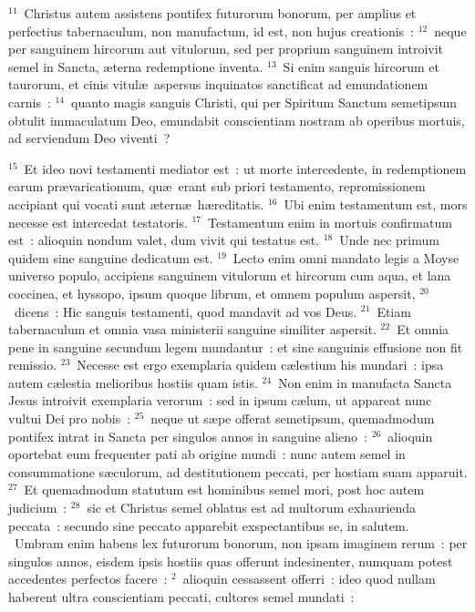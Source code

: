 ${}^{11}$~Christus autem assistens pontifex futurorum bonorum, per amplius et perfectius tabernaculum, non manufactum, id est, non hujus creationis~:
${}^{12}$~neque per sanguinem hircorum aut vitulorum, sed per proprium sanguinem introivit semel in Sancta, \ae terna redemptione inventa.
${}^{13}$~Si enim sanguis hircorum et taurorum, et cinis vitul\ae\ aspersus inquinatos sanctificat ad emundationem carnis~:
${}^{14}$~quanto magis sanguis Christi, qui per Spiritum Sanctum semetipsum obtulit immaculatum Deo, emundabit conscientiam nostram ab operibus mortuis, ad serviendum Deo viventi~?


${}^{15}$~Et ideo novi testamenti mediator est~: ut morte intercedente, in redemptionem earum pr\ae varicationum, qu\ae\ erant sub priori testamento, repromissionem accipiant qui vocati sunt \ae tern\ae\ h\ae reditatis.
${}^{16}$~Ubi enim testamentum est, mors necesse est intercedat testatoris.
${}^{17}$~Testamentum enim in mortuis confirmatum est~: alioquin nondum valet, dum vivit qui testatus est.
${}^{18}$~Unde nec primum quidem sine sanguine dedicatum est.
${}^{19}$~Lecto enim omni mandato legis a Moyse universo populo, accipiens sanguinem vitulorum et hircorum cum aqua, et lana coccinea, et hyssopo, ipsum quoque librum, et omnem populum aspersit,
${}^{20}$~dicens~: Hic sanguis testamenti, quod mandavit ad vos Deus.
${}^{21}$~Etiam tabernaculum et omnia vasa ministerii sanguine similiter aspersit.
${}^{22}$~Et omnia pene in sanguine secundum legem mundantur~: et sine sanguinis effusione non fit remissio.
${}^{23}$~Necesse est ergo exemplaria quidem c\ae lestium his mundari~: ipsa autem c\ae lestia melioribus hostiis quam istis.
${}^{24}$~Non enim in manufacta Sancta Jesus introivit exemplaria verorum~: sed in ipsum c\ae lum, ut appareat nunc vultui Dei pro nobis~:
${}^{25}$~neque ut s\ae pe offerat semetipsum, quemadmodum pontifex intrat in Sancta per singulos annos in sanguine alieno~:
${}^{26}$~alioquin oportebat eum frequenter pati ab origine mundi~: nunc autem semel in consummatione s\ae culorum, ad destitutionem peccati, per hostiam suam apparuit.
${}^{27}$~Et quemadmodum statutum est hominibus semel mori, post hoc autem judicium~:
${}^{28}$~sic et Christus semel oblatus est ad multorum exhaurienda peccata~: secundo sine peccato apparebit exspectantibus se, in salutem.
~Umbram enim habens lex futurorum bonorum, non ipsam imaginem rerum~: per singulos annos, eisdem ipsis hostiis quas offerunt indesinenter, numquam potest accedentes perfectos facere~:
${}^{2}$~alioquin cessassent offerri~: ideo quod nullam haberent ultra conscientiam peccati, cultores semel mundati~:
